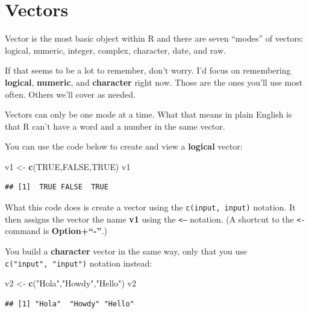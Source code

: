 \documentclass[
]{book}
\newenvironment{Shaded}{\begin{snugshade}}{\end{snugshade}}
\newcommand{\KeywordTok}[1]{\textcolor[rgb]{0.13,0.29,0.53}{\textbf{#1}}}
\newcommand{\NormalTok}[1]{#1}
\newcommand{\OtherTok}[1]{\textcolor[rgb]{0.56,0.35,0.01}{#1}}
\newcommand{\StringTok}[1]{\textcolor[rgb]{0.31,0.60,0.02}{#1}}
\begin{document}
\hypertarget{vectors}{%
\section{Vectors}\label{vectors}}

Vector is the most basic object within R and there are seven ``modes'' of vectors: logical, numeric, integer, complex, character, date, and raw.

If that seems to be a lot to remember, don't worry. I'd focus on remembering \textbf{logical}, \textbf{numeric}, and \textbf{character} right now. Those are the ones you'll use most often. Others we'll cover as needed.

Vectors can only be one mode at a time. What that means in plain English is that R can't have a word and a number in the same vector.

You can use the code below to create and view a \textbf{logical} vector:

\begin{Shaded}
\begin{Highlighting}[]
\NormalTok{v1 <-}\StringTok{ }\KeywordTok{c}\NormalTok{(}\OtherTok{TRUE}\NormalTok{,}\OtherTok{FALSE}\NormalTok{,}\OtherTok{TRUE}\NormalTok{)}
\NormalTok{v1}
\end{Highlighting}
\end{Shaded}

\begin{verbatim}
## [1]  TRUE FALSE  TRUE
\end{verbatim}

What this code does is create a vector using the \texttt{c(input,\ input)} notation. It then assigns the vector the name \textbf{v1} using the \texttt{\textless{}–} notation. (A shortcut to the \texttt{\textless{}-} command is \textbf{Option+``-''}.)

You build a \textbf{character} vector in the same way, only that you use \texttt{c("input",\ "input")} notation instead:

\begin{Shaded}
\begin{Highlighting}[]
\NormalTok{v2 <-}\StringTok{ }\KeywordTok{c}\NormalTok{(}\StringTok{"Hola"}\NormalTok{,}\StringTok{"Howdy"}\NormalTok{,}\StringTok{"Hello"}\NormalTok{)}
\NormalTok{v2}
\end{Highlighting}
\end{Shaded}

\begin{verbatim}
## [1] "Hola"  "Howdy" "Hello"
\end{verbatim}
\end{document}
